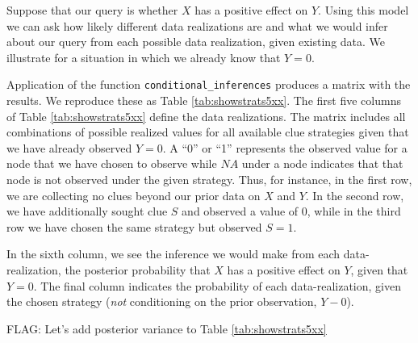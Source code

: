 \documentclass[12pt,]{book}
\begin{document}
Suppose that our query is whether \(X\) has a positive effect on \(Y\). Using this model we can ask how likely different data realizations are and what we would infer about our query from each possible data realization, given existing data. We illustrate for a situation in which we already know that \(Y=0\).

Application of the function \texttt{conditional\_inferences} produces a matrix with the results. We reproduce these as Table \ref{tab:showstrats5xx}. The first five columns of Table \ref{tab:showstrats5xx} define the data realizations. The matrix includes all combinations of possible realized values for all available clue strategies given that we have already observed \(Y=0\). A ``0'' or ``1'' represents the observed value for a node that we have chosen to observe while \(NA\) under a node indicates that that node is not observed under the given strategy. Thus, for instance, in the first row, we are collecting no clues beyond our prior data on \(X\) and \(Y\). In the second row, we have additionally sought clue \(S\) and observed a value of \(0\), while in the third row we have chosen the same strategy but observed \(S=1\).

In the sixth column, we see the inference we would make from each data-realization, the posterior probability that \(X\) has a positive effect on \(Y\), given that \(Y=0\). The final column indicates the probability of each data-realization, given the chosen strategy (\emph{not} conditioning on the prior observation, \(Y-0\)).

FLAG: Let's add posterior variance to Table \ref{tab:showstrats5xx}
\end{document}
